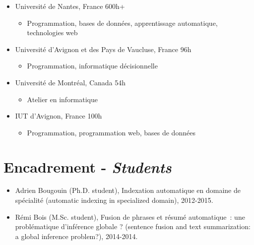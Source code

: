 \documentclass[11pt,a4paper]{moderncv}
\begin{document}
\begin{itemize}[leftmargin=0.5cm,itemsep=-0.2cm]
    \item Université de Nantes, France \hfill 600h+ %
    \vspace*{-0.3cm}
    \begin{itemize}
        \item Programmation, bases de données, apprentissage automatique, 
              technologies web
    \end{itemize}
    \item Université d'Avignon et des Pays de Vaucluse, France \hfill 96h
    \vspace*{-0.3cm}
    \begin{itemize}
        \item Programmation, informatique décisionnelle 
    \end{itemize}
    \item Université de Montréal, Canada \hfill 54h
    \vspace*{-0.3cm}
    \begin{itemize}
        \item Atelier en informatique
    \end{itemize}
    \item IUT d'Avignon, France \hfill 100h
    \vspace*{-0.3cm}
    \begin{itemize}
        \item Programmation, programmation web, bases de données
    \end{itemize}
\end{itemize}

\section{Encadrement - \textit{Students}}

\begin{itemize}[leftmargin=0.5cm,itemsep=-0.1cm]
    \item Adrien Bougouin (Ph.D. student), Indexation automatique en domaine de 
          spécialité (automatic indexing in specialized domain), 2012-2015.
    \item Rémi Bois (M.Sc. student), Fusion de phrases et résumé automatique~: 
          une problématique d’inférence globale ? (sentence fusion and text 
          summarization: a global inference problem?), 2014-2014.
\end{itemize}
\end{document}
